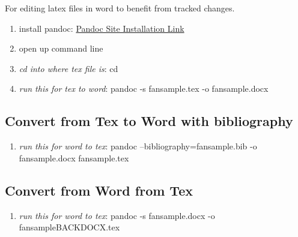 \documentclass[12pt,english]{article}
\begin{document}
For editing latex files in word to benefit from tracked changes.

\begin{enumerate}
	\item install pandoc: \href{https://pandoc.org/installing.html}{Pandoc Site Installation Link}
	\item open up command line
	\item \textit{cd into where tex file is}: cd 
	\item \textit{run this for tex to word}: pandoc -s fansample.tex -o fansample.docx
\end{enumerate}

\subsection{Convert from Tex to Word with bibliography}

\begin{enumerate}
	\item \textit{run this for word to tex}: pandoc --bibliography=fansample.bib -o fansample.docx fansample.tex
\end{enumerate}

\subsection{Convert from Word from Tex}

\begin{enumerate}
	\item \textit{run this for word to tex}: pandoc -s fansample.docx -o fansampleBACKDOCX.tex
\end{enumerate}


\printbibliography
\end{document}
